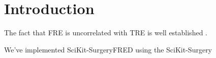 \section{Introduction}
The fact that \gls{FRE} is uncorrelated with \gls{TRE} is well established \cite{fitzpatrick2009}. 

We've implemented SciKit-SurgeryFRED \cite{stephen_thompson_2020_3908130} using the SciKit-Surgery \cite{PMID:32436132}

